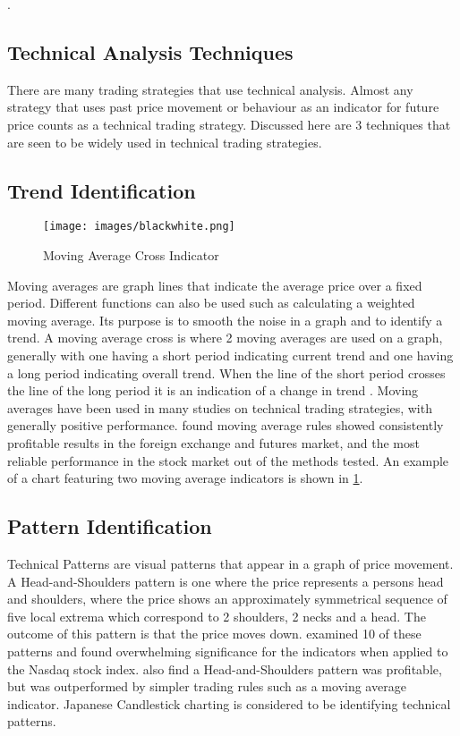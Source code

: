 \documentclass[12pt, oneside, a4paper]{article}
\theoremstyle{definition}
\begin{document}
.
\newpage
\appendix
\begin{appendices}

\section{Technical Analysis Techniques}

\label{app:tatechniques}

There are many trading strategies that use technical analysis. Almost any strategy that uses past price movement or behaviour as an indicator for future price counts as a technical trading strategy. Discussed here are 3 techniques that are seen to be widely used in technical trading strategies.

\subsection{Trend Identification}

\begin{figure}[H]
    \centering
    \texttt{[image: images/blackwhite.png]}
    \caption{Moving Average Cross Indicator}
    \label{ma}
\end{figure}

Moving averages are graph lines that indicate the average price over a fixed period. Different functions can also be used such as calculating a weighted moving average. Its purpose is to smooth the noise in a graph and to identify a trend. A moving average cross is where 2 moving averages are used on a graph, generally with one having a short period indicating current trend and one having a long period indicating overall trend. When the line of the short period crosses the line of the long period it is an indication of a change in trend \citep{brock1992}. Moving averages have been used in many studies on technical trading strategies, with generally positive performance. \cite{taprofitability} found moving average rules showed consistently profitable results in the foreign exchange and futures market, and the most reliable performance in the stock market out of the methods tested. An example of a chart featuring two moving average indicators is shown in \cref{ma}.

\subsection{Pattern Identification}
Technical Patterns are visual patterns that appear in a graph of price movement. A Head-and-Shoulders pattern is one where the price represents a persons head and shoulders, where the price shows an approximately symmetrical sequence of five local extrema which correspond to 2 shoulders, 2 necks and a head. The outcome of this pattern is that the price moves down. \cite{foundations} examined 10 of these patterns and found overwhelming significance for the indicators when applied to the Nasdaq stock index. \cite{chang1999methodical} also find a Head-and-Shoulders pattern was profitable, but was outperformed by simpler trading rules such as a moving average indicator. Japanese Candlestick charting is considered to be identifying technical patterns.


\end{appendices}
\end{document}

